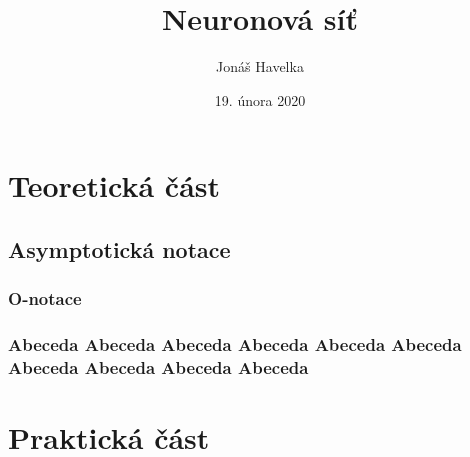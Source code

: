 \documentclass[12pt]{report}			%
\author{Jonáš Havelka}
\title{Neuronová síť}
\date{19. února 2020}
\begin{document}
	\mytitlepage						%
	
	
	\abstrakt{
		\lipsum[1]						%
	}{
		\lipsum[1]						%
	}
	
	\podekovani{
		\lipsum[2]						%
	}
	
	\tableofcontents\newpage			%
	
	
	\part{Teoretická část}
	
		\chapter{Asymptotická notace}
			
			\section{O-notace}
			\section{Abeceda Abeceda Abeceda Abeceda Abeceda Abeceda Abeceda Abeceda Abeceda Abeceda }
		
	\part{Praktická část}
\end{document}

